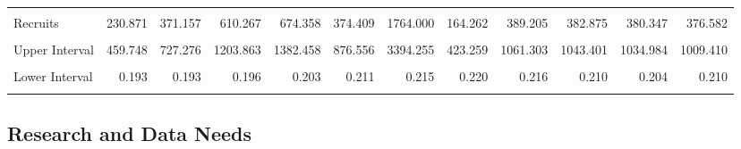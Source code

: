 \documentclass[
  english,
  a4paper,
]{article}
\begin{document}
\begin{table}[H]
{\begin{tabular}[t]{lrrrrrrrrrrr}
\cellcolor{gray!6}{Upper Interval} & \cellcolor{gray!6}{542.973} & \cellcolor{gray!6}{546.956} & \cellcolor{gray!6}{555.176} & \cellcolor{gray!6}{569.302} & \cellcolor{gray!6}{588.031} & \cellcolor{gray!6}{602.473} & \cellcolor{gray!6}{617.489} & \cellcolor{gray!6}{621.241} & \cellcolor{gray!6}{624.072} & \cellcolor{gray!6}{628.391} & \cellcolor{gray!6}{650.479}\\
Recruits & 230.871 & 371.157 & 610.267 & 674.358 & 374.409 & 1764.000 & 164.262 & 389.205 & 382.875 & 380.347 & 376.582\\
\addlinespace
\cellcolor{gray!6}{Lower Interval} & \cellcolor{gray!6}{115.936} & \cellcolor{gray!6}{189.416} & \cellcolor{gray!6}{309.359} & \cellcolor{gray!6}{328.949} & \cellcolor{gray!6}{159.924} & \cellcolor{gray!6}{916.754} & \cellcolor{gray!6}{63.748} & \cellcolor{gray!6}{142.731} & \cellcolor{gray!6}{140.496} & \cellcolor{gray!6}{139.774} & \cellcolor{gray!6}{140.492}\\
Upper Interval & 459.748 & 727.276 & 1203.863 & 1382.458 & 876.556 & 3394.255 & 423.259 & 1061.303 & 1043.401 & 1034.984 & 1009.410\\
\cellcolor{gray!6}{Fraction Unfished} & \cellcolor{gray!6}{0.336} & \cellcolor{gray!6}{0.338} & \cellcolor{gray!6}{0.342} & \cellcolor{gray!6}{0.352} & \cellcolor{gray!6}{0.364} & \cellcolor{gray!6}{0.373} & \cellcolor{gray!6}{0.382} & \cellcolor{gray!6}{0.381} & \cellcolor{gray!6}{0.379} & \cellcolor{gray!6}{0.378} & \cellcolor{gray!6}{0.391}\\
Lower Interval & 0.193 & 0.193 & 0.196 & 0.203 & 0.211 & 0.215 & 0.220 & 0.216 & 0.210 & 0.204 & 0.210\\
\cellcolor{gray!6}{Upper Interval} & \cellcolor{gray!6}{0.479} & \cellcolor{gray!6}{0.482} & \cellcolor{gray!6}{0.489} & \cellcolor{gray!6}{0.501} & \cellcolor{gray!6}{0.517} & \cellcolor{gray!6}{0.530} & \cellcolor{gray!6}{0.543} & \cellcolor{gray!6}{0.546} & \cellcolor{gray!6}{0.548} & \cellcolor{gray!6}{0.552} & \cellcolor{gray!6}{0.572}\\
\bottomrule
\end{tabular}}
\end{table}

\hypertarget{research-and-data-needs}{%
\subsection*{Research and Data Needs}\label{research-and-data-needs}}
\end{document}
